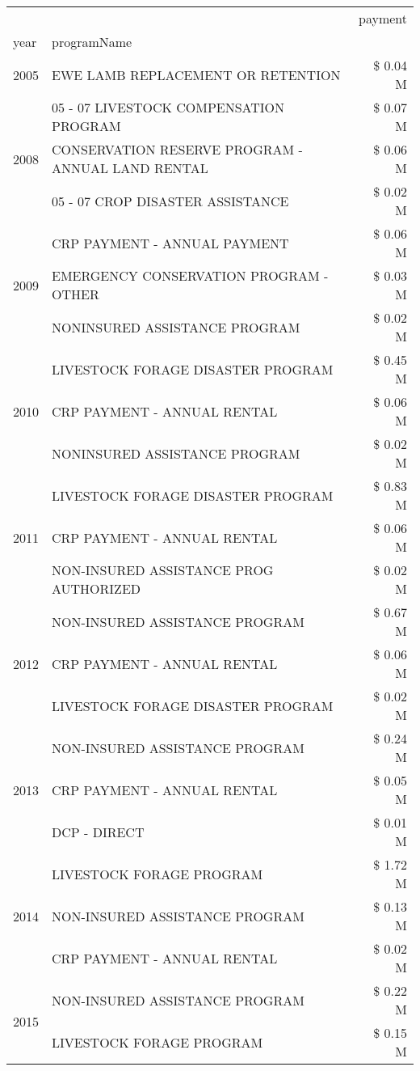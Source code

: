 \begin{tabular}{llr}
\toprule
 &  & payment \\
year & programName &  \\
\midrule
2005 & EWE LAMB REPLACEMENT OR RETENTION & \$ 0.04 M \\
\cline{1-3}
\multirow[t]{3}{*}{2008} & 05 - 07 LIVESTOCK COMPENSATION PROGRAM & \$ 0.07 M \\
 & CONSERVATION RESERVE PROGRAM - ANNUAL LAND RENTAL & \$ 0.06 M \\
 & 05 - 07 CROP DISASTER ASSISTANCE & \$ 0.02 M \\
\cline{1-3}
\multirow[t]{3}{*}{2009} & CRP PAYMENT - ANNUAL PAYMENT & \$ 0.06 M \\
 & EMERGENCY CONSERVATION PROGRAM - OTHER & \$ 0.03 M \\
 & NONINSURED ASSISTANCE PROGRAM & \$ 0.02 M \\
\cline{1-3}
\multirow[t]{3}{*}{2010} & LIVESTOCK FORAGE DISASTER PROGRAM & \$ 0.45 M \\
 & CRP PAYMENT - ANNUAL RENTAL & \$ 0.06 M \\
 & NONINSURED ASSISTANCE PROGRAM & \$ 0.02 M \\
\cline{1-3}
\multirow[t]{3}{*}{2011} & LIVESTOCK FORAGE DISASTER PROGRAM & \$ 0.83 M \\
 & CRP PAYMENT - ANNUAL RENTAL & \$ 0.06 M \\
 & NON-INSURED ASSISTANCE PROG AUTHORIZED & \$ 0.02 M \\
\cline{1-3}
\multirow[t]{3}{*}{2012} & NON-INSURED ASSISTANCE PROGRAM & \$ 0.67 M \\
 & CRP PAYMENT - ANNUAL RENTAL & \$ 0.06 M \\
 & LIVESTOCK FORAGE DISASTER PROGRAM & \$ 0.02 M \\
\cline{1-3}
\multirow[t]{3}{*}{2013} & NON-INSURED ASSISTANCE PROGRAM & \$ 0.24 M \\
 & CRP PAYMENT - ANNUAL RENTAL & \$ 0.05 M \\
 & DCP - DIRECT & \$ 0.01 M \\
\cline{1-3}
\multirow[t]{3}{*}{2014} & LIVESTOCK FORAGE PROGRAM & \$ 1.72 M \\
 & NON-INSURED ASSISTANCE PROGRAM & \$ 0.13 M \\
 & CRP PAYMENT - ANNUAL RENTAL & \$ 0.02 M \\
\cline{1-3}
\multirow[t]{3}{*}{2015} & NON-INSURED ASSISTANCE PROGRAM & \$ 0.22 M \\
 & LIVESTOCK FORAGE PROGRAM & \$ 0.15 M \\

\end{tabular}
